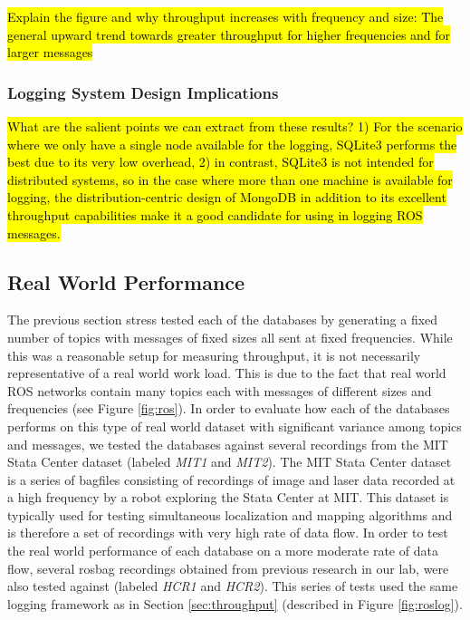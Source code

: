 \documentclass[nocopyrightspace]{acm_proc_article-sp}
\begin{document}
\hl{Explain the figure and why throughput increases with frequency and size: The general upward trend towards greater throughput for higher frequencies and for larger messages}

\subsubsection{Logging System Design Implications}

\hl{What are the salient points we can extract from these results? 1) For the scenario where we only have a single node available for the logging, SQLite3 performs the best due to its very low overhead, 2) in contrast, SQLite3 is not intended for distributed systems, so in the case where more than one machine is available for logging, the distribution-centric design of MongoDB in addition to its excellent throughput capabilities make it a good candidate for using in logging ROS messages.}

\subsection{Real World Performance}
\label{sec:realworld}
The previous section stress tested each of the databases by generating a fixed number of topics with messages of fixed sizes all sent at fixed frequencies. While this was a reasonable setup for measuring throughput, it is not necessarily representative of a real world work load. This is due to the fact that real world ROS networks contain many topics each with messages of different sizes and frequencies (see Figure \ref{fig:ros}). In order to evaluate how each of the databases performs on this type of real world dataset with significant variance among topics and messages, we tested the databases against several recordings from the MIT Stata Center dataset (labeled \textit{MIT1} and \textit{MIT2}). The MIT Stata Center dataset is a series of bagfiles consisting of recordings of image and laser data recorded at a high frequency by a robot exploring the Stata Center at MIT. This dataset is typically used for testing simultaneous localization and mapping algorithms and is therefore a set of recordings with very high rate of data flow. In order to test the real world performance of each database on a more moderate rate of data flow, several rosbag recordings obtained from previous research in our lab, were also tested against (labeled \textit{HCR1} and \textit{HCR2}). This series of tests used the same logging framework as in Section \ref{sec:throughput} (described in Figure \ref{fig:roslog}).
\end{document}
